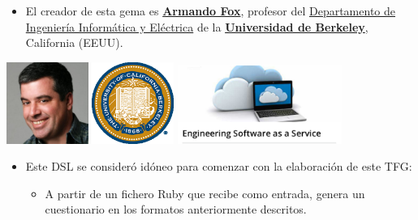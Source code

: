 \documentclass{beamer}
\begin{document}
\begin{frame}
  \begin{itemize}
    \item El creador de esta gema es \href{http://www.armandofox.com/geek}{{\bfseries Armando Fox}}, profesor del 
    \href{http://www.cs.berkeley.edu/}{Departamento de Ingeniería Informática y Eléctrica} de la 
    \href{http://www.berkeley.edu/}{{\bfseries Universidad de Berkeley}}, California (EEUU).
  \end{itemize}
  \begin{center}
    \includegraphics[width=0.2\textwidth]{img/armando.eps}
    \hspace*{0.8cm}
    \includegraphics[width=0.2\textwidth]{img/Berkeley.eps}
    \hspace*{0.5cm}
    \includegraphics[width=0.4\textwidth]{img/sassmoc.eps}
  \end{center}
  \framebreak
  
  \begin{itemize}
    \item Este DSL se consideró idóneo para comenzar con la elaboración de este TFG:
    \begin{itemize}
      \item A partir de un fichero Ruby que recibe como entrada, genera un cuestionario en los formatos anteriormente descritos.
    \end{itemize}
    

\end{itemize}
\end{frame}
\end{document}
